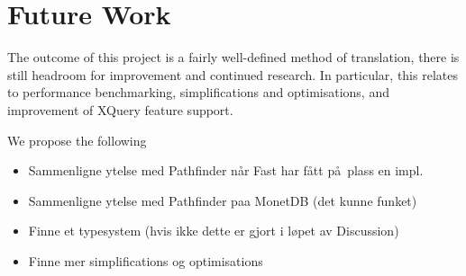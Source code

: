 \chapter{Future Work}
\label{chapter:future}
The outcome of this project is a fairly well-defined method of translation,
there is still headroom for improvement and continued research. In particular,
this relates to performance benchmarking, simplifications and optimisations,
and improvement of XQuery feature support.

We propose the following 

\begin{itemize}	
  \item Sammenligne ytelse med Pathfinder n\aa r Fast har f\aa tt p\aa~plass en impl.
  \item Sammenligne ytelse med Pathfinder paa MonetDB (det kunne funket) 
  \item Finne et typesystem (hvis ikke dette er gjort i l\o pet av Discussion)
  \item Finne mer simplifications og optimisations
\end{itemize}